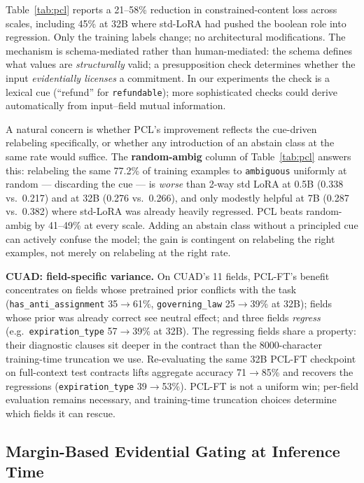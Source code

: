 \documentclass{article}
\begin{document}
Table~\ref{tab:pcl} reports a 21--58\% reduction in constrained-content loss across scales, including 45\% at 32B where std-LoRA had pushed the boolean role into regression. Only the training labels change; no architectural modifications. The mechanism is schema-mediated rather than human-mediated: the schema defines what values are \emph{structurally} valid; a presupposition check determines whether the input \emph{evidentially licenses} a commitment. In our experiments the check is a lexical cue (``refund'' for \texttt{refundable}); more sophisticated checks could derive automatically from input--field mutual information. 

A natural concern is whether PCL's improvement reflects the cue-driven relabeling specifically, or whether any introduction of an abstain class at the same rate would suffice. The \textbf{random-ambig} column of Table~\ref{tab:pcl} answers this: relabeling the same 77.2\% of training examples to \texttt{ambiguous} uniformly at random --- discarding the cue --- is \emph{worse} than 2-way std LoRA at 0.5B (0.338 vs.\ 0.217) and at 32B (0.276 vs.\ 0.266), and only modestly helpful at 7B (0.287 vs.\ 0.382) where std-LoRA was already heavily regressed. PCL beats random-ambig by 41--49\% at every scale. Adding an abstain class without a principled cue can actively confuse the model; the gain is contingent on relabeling the right examples, not merely on relabeling at the right rate.

\textbf{CUAD: field-specific variance.} On CUAD's 11 fields, PCL-FT's benefit concentrates on fields whose pretrained prior conflicts with the task (\texttt{has\_anti\_assignment} 35$\rightarrow$61\%, \texttt{governing\_law} 25$\rightarrow$39\% at 32B); fields whose prior was already correct see neutral effect; and three fields \emph{regress} (e.g.\ \texttt{expiration\_type} 57$\rightarrow$39\% at 32B). The regressing fields share a property: their diagnostic clauses sit deeper in the contract than the 8000-character training-time truncation we use. Re-evaluating the same 32B PCL-FT checkpoint on full-context test contracts lifts aggregate accuracy 71$\rightarrow$85\% and recovers the regressions (\texttt{expiration\_type} 39$\rightarrow$53\%). PCL-FT is not a uniform win; per-field evaluation remains necessary, and training-time truncation choices determine which fields it can rescue.

\subsection{Margin-Based Evidential Gating at Inference Time}\label{sec:gating}
\end{document}
